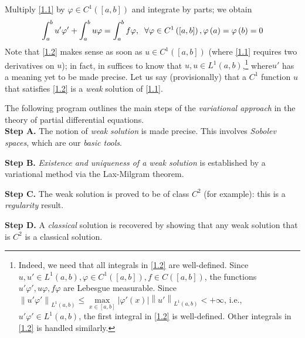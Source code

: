 \documentclass[a4paper,oneside]{book}
\numberwithin{equation}{chapter}
\begin{document}
Multiply \eqref{1.1} by $\varphi  \in {C^1}\left( {\left[ {a,b} \right]} \right)$ and integrate by parts; we obtain
\begin{align}
\label{1.2}
\int_a^b {u'\varphi '}  + \int_a^b {u\varphi }  = \int_a^b {f\varphi } ,\hspace{0.2cm}\forall \varphi  \in {C^1}\left( {\left[ {a,b} \right]} \right),\varphi \left( a \right) = \varphi \left( b \right) = 0
\end{align}
Note that \eqref{1.2} makes sense as soon as $u \in {C^1}\left( {\left[ {a,b} \right]} \right)$ (where \eqref{1.1} requires two derivatives on $u$); in fact, in suffices to know that $u,u\in L^1\left(a,b\right)$,\footnote{Indeed, we need that all integrals in \eqref{1.2} are well-defined. Since $u,u' \in {L^1}\left( {a,b} \right),\varphi  \in {C^1}\left( {\left[ {a,b} \right]} \right),f \in C\left( {\left[ {a,b} \right]} \right)$, the functions $u'\varphi',u\varphi,f\varphi$ are Lebesgue measurable. Since ${\left\| {u'\varphi '} \right\|_{{L^1}\left( {a,b} \right)}} \le \mathop {\max }\limits_{x \in \left[ {a,b} \right]} \left| {\varphi '\left( x \right)} \right|{\left\| {u'} \right\|_{{L^1}\left( {a,b} \right)}} <  + \infty $, i.e., $u'\varphi ' \in {L^1}\left( {a,b} \right)$, the first integral in \eqref{1.2} is well-defined. Other integrals in \eqref{1.2} is handled similarly.} where$u'$ has a meaning yet to be made precise. Let us say (provisionally) that a $C^1$ function $u$ that satisfies \eqref{1.2} is a \textit{weak} solution of \eqref{1.1}.

The following program outlines the main steps of the \textit{variational approach} in the theory of partial differential equations.\\

\textbf{Step A.} The notion of \textit{weak solution} is made precise. This involves \textit{Sobolev spaces}, which are our \textit{basic tools}.

\textbf{Step B.} \textit{Existence and uniqueness of a weak solution} is established by a variational method via the Lax-Milgram theorem.

\textbf{Step C.} The weak solution is proved to be of class $C^2$ (for example): this is a \textit{regularity} result.

\textbf{Step D.} A \textit{classical} solution is recovered by showing that any weak solution that is $C^2$ is a classical solution.\\
\end{document}
